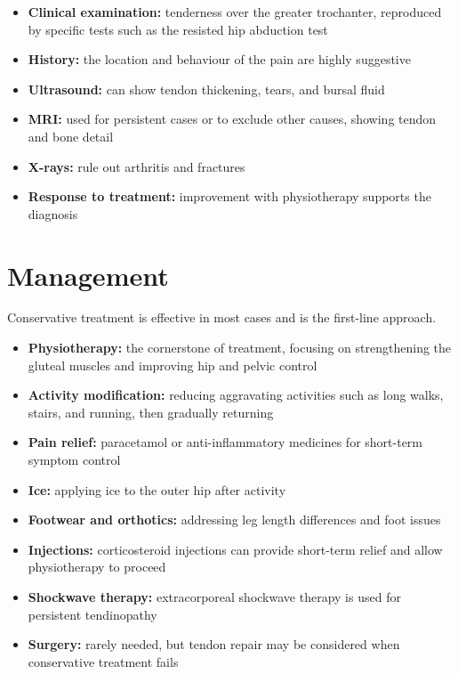 \begin{itemize}
    \item \textbf{Clinical examination:} tenderness over the greater trochanter, reproduced by specific tests such as the resisted hip abduction test
    \item \textbf{History:} the location and behaviour of the pain are highly suggestive
    \item \textbf{Ultrasound:} can show tendon thickening, tears, and bursal fluid
    \item \textbf{MRI:} used for persistent cases or to exclude other causes, showing tendon and bone detail
    \item \textbf{X-rays:} rule out arthritis and fractures
    \item \textbf{Response to treatment:} improvement with physiotherapy supports the diagnosis
\end{itemize}

\section*{Management}
Conservative treatment is effective in most cases and is the first-line approach.

\begin{itemize}
    \item \textbf{Physiotherapy:} the cornerstone of treatment, focusing on strengthening the gluteal muscles and improving hip and pelvic control
    \item \textbf{Activity modification:} reducing aggravating activities such as long walks, stairs, and running, then gradually returning
    \item \textbf{Pain relief:} paracetamol or anti-inflammatory medicines for short-term symptom control
    \item \textbf{Ice:} applying ice to the outer hip after activity
    \item \textbf{Footwear and orthotics:} addressing leg length differences and foot issues
    \item \textbf{Injections:} corticosteroid injections can provide short-term relief and allow physiotherapy to proceed
    \item \textbf{Shockwave therapy:} extracorporeal shockwave therapy is used for persistent tendinopathy
    \item \textbf{Surgery:} rarely needed, but tendon repair may be considered when conservative treatment fails
\end{itemize}

